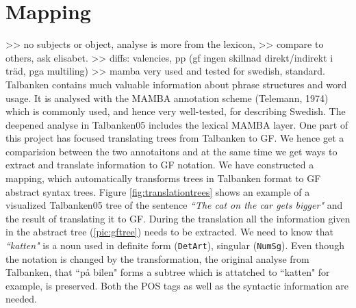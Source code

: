 \documentclass{report}
\begin{document}
\section{Mapping}
>> no subjects or object, analyse is more from the lexicon,
>> compare to others, ask elisabet.
>> diffs: valencies, pp (gf ingen skillnad direkt/indirekt i träd, pga multiling)
>> mamba very used and tested for swedish, standard.
\label{sec:Mapping}
Talbanken contains much valuable information about phrase structures and word 
usage. It is analysed with the MAMBA annotation scheme (Telemann, 1974) which is 
commonly used, and hence very well-tested, for describing Swedish.
The deepened analyse in Talbanken05 includes the lexical MAMBA layer. 
One part of this project has focused translating trees from Talbanken to GF.
We hence get a comparision between the two annotaitons and at the same time
we get ways to extract and translate information to GF notation. We have
constructed a mapping, which 
automatically transforms trees in Talbanken format to GF abstract syntax trees.
Figure \ref{fig:translationtrees} shows an example of a visualized Talbanken05 tree
of the sentence \emph{``The cat on the car gets bigger"} and the result of translating it to GF.
During the translation all the information given in the abstract tree
(\ref{pic:gftree}) needs to be extracted. We need to know that \emph{``katten"} is a noun
used in definite form (\verb-DetArt-), singular (\verb-NumSg-). Even though the
notation is changed by the transformation, the original analyse from Talbanken,
that ``på bilen" forms a subtree which is attatched to ``katten" for example,
is preserved.
Both the POS tags as well as the syntactic information are needed.
\end{document}
